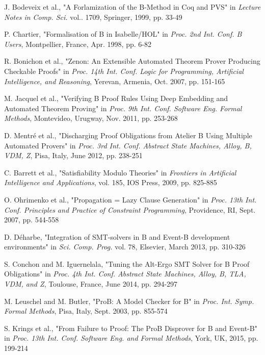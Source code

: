 \documentclass[11pt,journal]{IEEEtran}
\begin{document}
\begin{thebibliography}{1}
		J. Bodeveix et al., "A Forlamization of the B-Method in Coq and PVS" in \emph{Lecture Notes in Comp. Sci.} vol.. 1709, Springer, 1999, pp. 33-49
		
		P. Chartier, "Formalisation of B in Isabelle/HOL" in \emph{Proc. 2nd Int. Conf. B Users}, Montpellier, France, Apr. 1998, pp. 6-82
		
		R. Bonichon et al., "Zenon: An Extensible Automated Theorem Prover Producing Checkable Proofs" in \emph{Proc. 14th Int. Conf. Logic for Programming, Artificial Intelligence, and Reasoning}, Yerevan, Armenia, Oct. 2007, pp. 151-165
		
		M. Jacquel et al., "Verifying B Proof Rules Using Deep Embedding and Automated Theorem Proving" in \emph{Proc. 9th Int. Conf. Software Eng. Formal Methods}, Montevideo, Urugway, Nov. 2011, pp. 253-268
		
		D. Mentr\'{e} et al., "Discharging Proof Obligations from Atelier B Using Multiple Automated Provers" in \emph{Proc. 3rd Int. Conf. Abstract State Machines, Alloy, B, VDM, Z}, Pisa, Italy, June 2012, pp. 238-251
		
		C. Barrett et al., "Satisfiability Modulo Theories" in \emph{Frontiers in Artificial Intelligence and Applications}, vol. 185, IOS Press, 2009, pp. 825-885
		
		O. Ohrimenko et al., "Propagation = Lazy Clause Generation" in \emph{Proc. 13th Int. Conf. Principles and Practice of Constraint Programming}, Providence, RI, Sept. 2007, pp. 544-558
		
		D. D\'{e}harbe, "Integration of SMT-solvers in B and Event-B development environments" in \emph{Sci. Comp. Prog.} vol. 78, Elsevier, March 2013, pp. 310-326
		
		S. Conchon and M. Iguernelala, "Tuning the Alt-Ergo SMT Solver for B Proof Obligations" in \emph{Proc. 4th Int. Conf. Abstract State Machines, Alloy, B, TLA, VDM, and Z}, Toulouse, France, June 2014, pp. 294-297
		
		M. Leuschel and M. Butler, "ProB: A Model Checker for B" in \emph{Proc. Int. Symp. Formal Methods}, Pisa, Italy, Sept. 2003, pp. 855-574 
		
		S. Krings et al., "From Failure to Proof: The ProB Disprover for B and Event-B" in \emph{Proc. 13th Int. Conf. Software Eng. and Formal Methods}, York, UK, 2015, pp. 199-214
		

\end{thebibliography}
\end{document}
